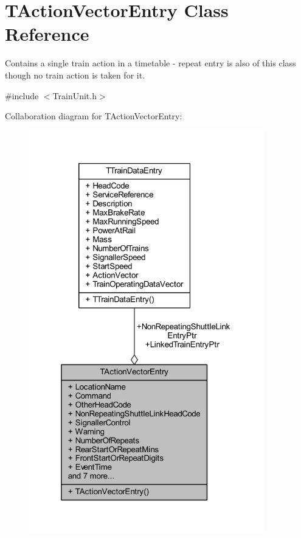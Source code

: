 \hypertarget{class_t_action_vector_entry}{}\section{T\+Action\+Vector\+Entry Class Reference}
\label{class_t_action_vector_entry}


Contains a single train action in a timetable -\/ repeat entry is also of this class though no train action is taken for it.  




{\ttfamily \#include $<$Train\+Unit.\+h$>$}



Collaboration diagram for T\+Action\+Vector\+Entry\+:
\nopagebreak
\begin{figure}[H]
\begin{center}
\leavevmode
\includegraphics[width=289pt]{class_t_action_vector_entry__coll__graph}
\end{center}
\end{figure}
